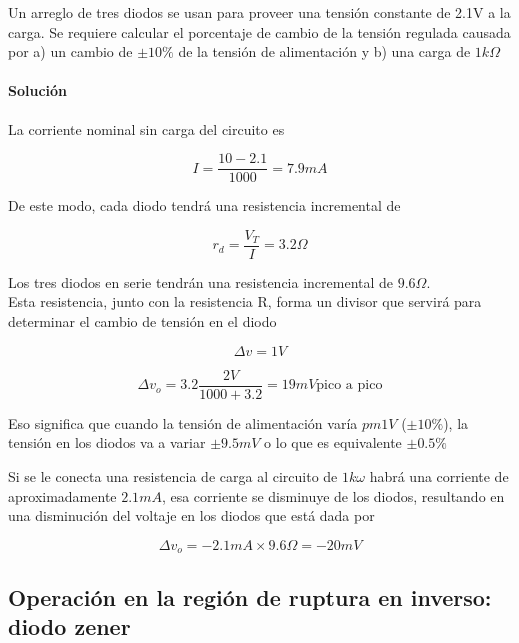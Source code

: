 Un arreglo de tres diodos se usan para proveer una tensión constante de 2.1V a la carga. Se requiere calcular el porcentaje de cambio de la tensión regulada causada por a) un cambio de $\pm 10\%$ de la tensión de alimentación y b) una carga de $1k\Omega$


\paragraph{Solución}

La corriente nominal sin carga del circuito es

\begin{equation*}
I = \frac{10-2.1}{1000} = 7.9mA
\end{equation*}

De este modo, cada diodo tendrá una resistencia incremental de 

\begin{equation*}
r_d = \frac{V_T}{I} = 3.2\Omega
\end{equation*}

Los tres diodos en serie tendrán una resistencia incremental de $9.6 \Omega$. \\
Esta resistencia, junto con la resistencia R, forma un divisor que servirá para determinar el cambio de tensión en el diodo

\begin{equation*}
\Delta v = 1V
\end{equation*}

\begin{equation*}
\Delta v_o = 3.2\frac{2V}{1000+3.2} =  19mV \text{pico a pico} 
\end{equation*}

Eso significa que cuando la tensión de alimentación varía $pm1V$ ($\pm 10\%$), la tensión en los diodos va a variar $\pm9.5mV$ o lo que es equivalente $\pm0.5\%$

Si se le conecta una resistencia de carga al circuito de $1k\omega$ habrá una corriente de aproximadamente $2.1mA$, esa corriente se disminuye de los diodos, resultando en una disminución del voltaje en los diodos que está dada por

\begin{equation*}
\Delta v_o = -2.1mA \times 9.6 \Omega = -20mV
\end{equation*}

\subsection{Operación en la región de ruptura en inverso: diodo zener}

